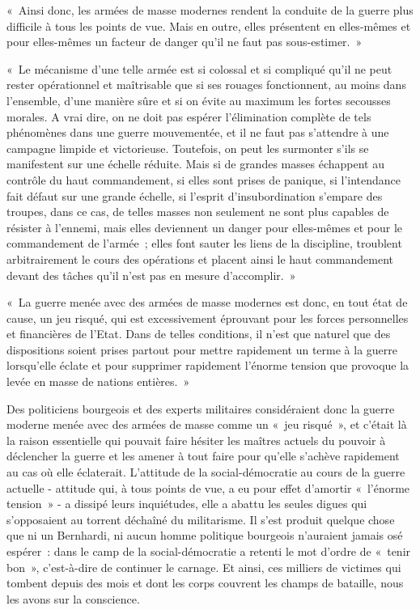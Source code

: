 \documentclass[french,twoside]{book} %
\newenvironment{quoteblock}%
  {\begin{quoting}}
  {\end{quoting}}
\newenvironment{quotebar}{%
    \def\FrameCommand{{\color{rubric!10!}\vrule width 0.5em} \hspace{0.9em}}%
    \def\OuterFrameSep{\itemsep} %
    \MakeFramed {\advance\hsize-\width \FrameRestore}
  }%
  {%
    \endMakeFramed
  }
\renewenvironment{quoteblock}%
  {%
    \savenotes
    \setstretch{0.9}
    \normalfont
    \begin{quotebar}
  }
  {%
    \end{quotebar}
    \spewnotes
  }
\begin{document}
\begin{quoteblock}
 \noindent « Ainsi donc, les armées de masse modernes rendent la conduite de la guerre plus difficile à tous les points de vue. Mais en outre, elles présentent en elles-mêmes et pour elles-mêmes un facteur de danger qu’il ne faut pas sous-estimer. »\par
 « Le mécanisme d’une telle armée est si colossal et si compliqué qu’il ne peut rester opérationnel et maîtrisable que si ses rouages fonctionnent, au moins dans l’ensemble, d’une manière sûre et si on évite au maximum les fortes secousses morales. A vrai dire, on ne doit pas espérer l’élimination complète de tels phénomènes dans une guerre mouvementée, et il ne faut pas s’attendre à une campagne limpide et victorieuse. Toutefois, on peut les surmonter s’ils se manifestent sur une échelle réduite. Mais si de grandes masses échappent au contrôle du haut commandement, si elles sont prises de panique, si l’intendance fait défaut sur une grande échelle, si l’esprit d’insubordination s’empare des troupes, dans ce cas, de telles masses non seulement ne sont plus capables de résister à l’ennemi, mais elles deviennent un danger pour elles-mêmes et pour le commandement de l’armée ; elles font sauter les liens de la discipline, troublent arbitrairement le cours des opérations et placent ainsi le haut commandement devant des tâches qu’il n’est pas en mesure d’accomplir. »\par
 « La guerre menée avec des armées de masse modernes est donc, en tout état de cause, un jeu risqué, qui est excessivement éprouvant pour les forces personnelles et financières de l’Etat. Dans de telles conditions, il n’est que naturel que des dispositions soient prises partout pour mettre rapidement un terme à la guerre lorsqu’elle éclate et pour supprimer rapidement l’énorme tension que provoque la levée en masse de nations entières. »
\end{quoteblock}

\noindent Des politiciens bourgeois et des experts militaires considéraient donc la guerre moderne menée avec des armées de masse comme un « jeu risqué », et c’était là la raison essentielle qui pouvait faire hésiter les maîtres actuels du pouvoir à déclencher la guerre et les amener à tout faire pour qu’elle s’achève rapidement au cas où elle éclaterait. L'attitude de la social-démocratie au cours de la guerre actuelle - attitude qui, à tous points de vue, a eu pour effet d’amortir « l’énorme tension » - a dissipé leurs inquiétudes, elle a abattu les seules digues qui s’opposaient au torrent déchaîné du militarisme. Il s’est produit quelque chose que ni un Bernhardi, ni aucun homme politique bourgeois n’auraient jamais osé espérer : dans le camp de la social-démocratie a retenti le mot d’ordre de « tenir bon », c’est-à-dire de continuer le carnage. Et ainsi, ces milliers de victimes qui tombent depuis des mois et dont les corps couvrent les champs de bataille, nous les avons sur la conscience.
\end{document}

